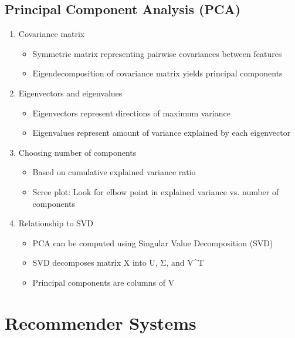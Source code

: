 \documentclass{article}
\begin{document}
\subsection{Principal Component Analysis (PCA)}
\begin{enumerate}
    \item Covariance matrix
    \begin{itemize}
        \item Symmetric matrix representing pairwise covariances between features
        \item Eigendecomposition of covariance matrix yields principal components
    \end{itemize}
    
    \item Eigenvectors and eigenvalues
    \begin{itemize}
        \item Eigenvectors represent directions of maximum variance
        \item Eigenvalues represent amount of variance explained by each eigenvector
    \end{itemize}
    
    \item Choosing number of components
    \begin{itemize}
        \item Based on cumulative explained variance ratio
        \item Scree plot: Look for elbow point in explained variance vs. number of components
    \end{itemize}
    
    \item Relationship to SVD
    \begin{itemize}
        \item PCA can be computed using Singular Value Decomposition (SVD)
        \item SVD decomposes matrix X into U, Σ, and V^T
        \item Principal components are columns of V
    \end{itemize}
\end{enumerate}

\section{Recommender Systems}
\end{document}
